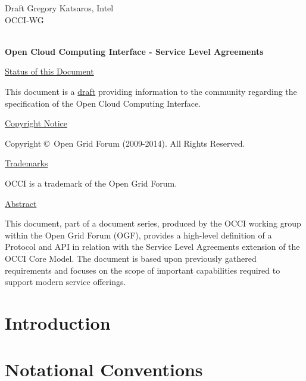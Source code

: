 \documentclass[10pt,a4paper]{article}
\begin{document}
\thispagestyle{empty}

Draft \hfill  Gregory Katsaros, Intel\\
OCCI-WG \hfill  \\
\rightline {\today}\\

\vspace*{0.5in}

\begin{Large}
\textbf{Open Cloud Computing Interface - Service Level Agreements}
\end{Large}

\vspace*{0.5in}

\underline{Status of this Document}


This document is a \underline{draft} providing information to the community regarding the specification of the Open Cloud Computing Interface.


\underline{Copyright Notice}

Copyright \copyright ~Open Grid Forum (2009-2014). All Rights
Reserved.

\underline{Trademarks}

OCCI is a trademark of the Open Grid Forum.

\underline{Abstract}

%

This document, part of a document series, produced by the OCCI working group within the Open Grid Forum (OGF), provides a high-level definition of a Protocol and API in relation with the Service Level Agreements extension of the OCCI Core Model. The document is based upon previously gathered requirements and focuses on the scope of important capabilities required to support modern service offerings. 





\newpage
\tableofcontents
\newpage

\section{Introduction}



\section{Notational Conventions}

\end{document}
